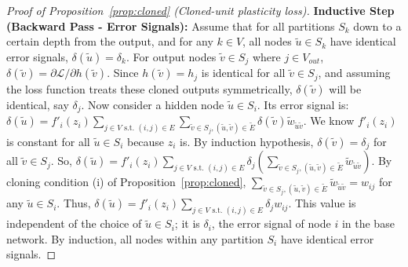 \documentclass{article}
\newcommand{\Loss}{\mathcal{L}}
\begin{document}
\begin{proof}[Proof of Proposition~\ref{prop:cloned} (Cloned-unit plasticity loss)]
\textbf{Inductive Step (Backward Pass - Error Signals):} Assume that for all partitions $S_k$ down to a certain depth from the output, and for any $k \in V$, all nodes $\widetilde{u} \in S_k$ have identical error signals, $\delta(\widetilde{u}) = \delta_k$.
For output nodes $\widetilde{v} \in S_j$ where $j \in V_{out}$, $\delta(\widetilde{v}) = \partial\Loss/\partial h(\widetilde{v})$. Since $h(\widetilde{v})=h_j$ is identical for all $\widetilde{v} \in S_j$, and assuming the loss function treats these cloned outputs symmetrically, $\delta(\widetilde{v})$ will be identical, say $\delta_j$.
Now consider a hidden node $\widetilde{u} \in S_i$. Its error signal is:
$\delta(\widetilde{u}) = f'_i(z_i) \sum_{j \in V \text{ s.t. } (i,j) \in E} \sum_{\widetilde{v} \in S_j, (\widetilde{u},\widetilde{v}) \in \widetilde{E}} \delta(\widetilde{v}) \widetilde{w}_{\widetilde{u}\widetilde{v}}$.
We know $f'_i(z_i)$ is constant for all $\widetilde{u} \in S_i$ because $z_i$ is. By induction hypothesis, $\delta(\widetilde{v}) = \delta_j$ for all $\widetilde{v} \in S_j$. So,
$\delta(\widetilde{u}) = f'_i(z_i) \sum_{j \in V \text{ s.t. } (i,j) \in E} \delta_j \left( \sum_{\widetilde{v} \in S_j, (\widetilde{u},\widetilde{v}) \in \widetilde{E}} \widetilde{w}_{\widetilde{u}\widetilde{v}} \right)$.
By cloning condition (i) of Proposition~\ref{prop:cloned}, $\sum_{\widetilde{v} \in S_j, (\widetilde{u},\widetilde{v}) \in \widetilde{E}} \widetilde{w}_{\widetilde{u}\widetilde{v}} = w_{ij}$ for any $\widetilde{u} \in S_i$.
Thus, $\delta(\widetilde{u}) = f'_i(z_i) \sum_{j \in V \text{ s.t. } (i,j) \in E} \delta_j w_{ij}$. This value is independent of the choice of $\widetilde{u} \in S_i$; it is $\delta_i$, the error signal of node $i$ in the base network.
By induction, all nodes within any partition $S_i$ have identical error signals.


\end{proof}
\end{document}
